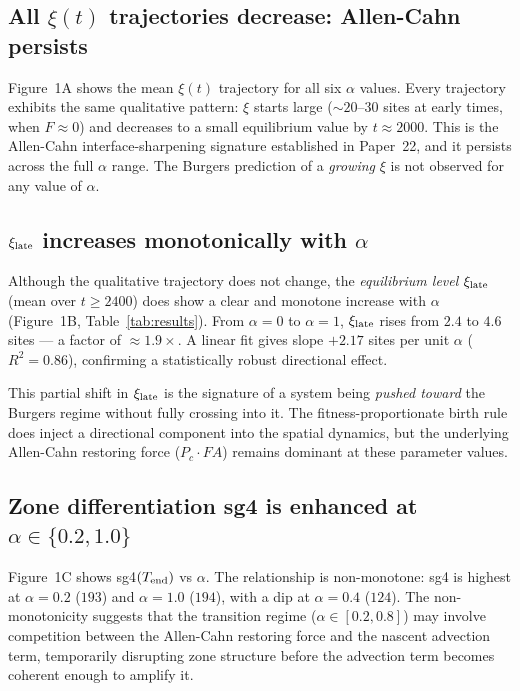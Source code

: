\documentclass[11pt]{article}
\begin{document}
\subsection{All $\xi(t)$ trajectories decrease: Allen-Cahn persists}

Figure~1A shows the mean $\xi(t)$ trajectory for all six $\alpha$ values.
Every trajectory exhibits the same qualitative pattern: $\xi$ starts
large (${\sim}20$--$30$ sites at early times, when $F \approx 0$) and
decreases to a small equilibrium value by $t \approx 2000$.
This is the Allen-Cahn interface-sharpening signature established in
Paper~22, and it persists across the full $\alpha$ range.
The Burgers prediction of a \emph{growing} $\xi$ is not observed for any
value of $\alpha$.

\subsection{$\xi_{\rm late}$ increases monotonically with $\alpha$}

Although the qualitative trajectory does not change, the \emph{equilibrium
level} $\xi_{\rm late}$ (mean over $t \geq 2400$) does show a clear and
monotone increase with $\alpha$ (Figure~1B, Table~\ref{tab:results}).
From $\alpha=0$ to $\alpha=1$, $\xi_{\rm late}$ rises from $2.4$ to $4.6$ sites
--- a factor of ${\approx}1.9\times$.
A linear fit gives slope $+2.17$ sites per unit $\alpha$ ($R^2 = 0.86$),
confirming a statistically robust directional effect.

This partial shift in $\xi_{\rm late}$ is the signature of a system being
\emph{pushed toward} the Burgers regime without fully crossing into it.
The fitness-proportionate birth rule does inject a directional component
into the spatial dynamics, but the underlying Allen-Cahn restoring force
($P_c \cdot FA$) remains dominant at these parameter values.

\subsection{Zone differentiation sg4 is enhanced at $\alpha \in \{0.2, 1.0\}$}

Figure~1C shows sg4$(T_{\rm end})$ vs $\alpha$.
The relationship is non-monotone: sg4 is highest at $\alpha=0.2$
($193$) and $\alpha=1.0$ ($194$), with a dip at $\alpha=0.4$ ($124$).
The non-monotonicity suggests that the transition regime ($\alpha \in [0.2, 0.8]$)
may involve competition between the Allen-Cahn restoring force and the
nascent advection term, temporarily disrupting zone structure before
the advection term becomes coherent enough to amplify it.
\end{document}
